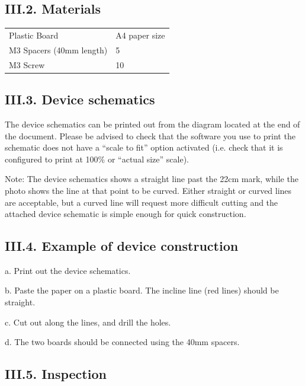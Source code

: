 \documentclass{article}
\begin{document}
\subsection{III.2. Materials}

\begin{table}
\begin{tabularx}{\textwidth}{
p{}
p{}}
Plastic Board & A4 paper size \\
M3 Spacers (40mm length) & 5 \\
M3 Screw & 10 \\

\end{tabularx}

\end{table}

\subsection{III.3. Device schematics} 

The device schematics can be printed out from the diagram located at the end of the document. Please be advised to check that the software you use to print the schematic does not have a ``scale to fit'' option activated (i.e. check that it is configured to print at 100\% or ``actual size'' scale). 

Note: The device schematics shows a straight line past the 22cm mark, while the photo shows the line at that point to be curved. Either straight or curved lines are acceptable, but a curved line will request more difficult cutting and the attached device schematic is simple enough for quick construction.

\subsection{III.4. Example of device construction} 

a. Print out the device schematics. 

b. Paste the paper on a plastic board. The incline line (red lines) should be straight. 

c. Cut out along the lines, and drill the holes. 

d. The two boards should be connected using the 40mm spacers. 

\subsection{III.5. Inspection} 
\end{document}
